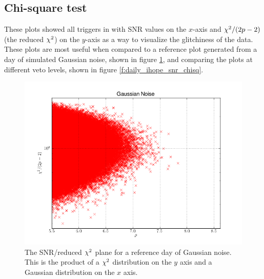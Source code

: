 \subsection{Chi-square test}

These plots showed all triggers in with SNR values on the $x$-axis and
$\chi^2 / (2p-2)$ (the reduced $\chisq$) on the $y$-axis as a way to
visualize the glitchiness of the data.  These plots are most useful
when compared to a reference plot generated from a day of simulated
Gaussian noise, shown in figure \ref{f:gaussian_snr_chisq}, and
comparing the plots at different veto levels, shown in figure
\ref{f:daily_ihope_snr_chisq}.

\newpage
\begin{figure}
\includegraphics[width=0.85\linewidth]{figures/detchar/GAUSSIAN_0_UNCLUSTERED_chisq.png}
\caption[SNR/reduced $\chisq$ values in Gaussian noise]{
\label{f:gaussian_snr_chisq}
The SNR/reduced $\chisq$ plane for a reference day of
Gaussian noise.  This is the product of a $\chisq$ distribution on the
$y$ axis and a Gaussian distribution on the $x$ axis.}
\end{figure}%

